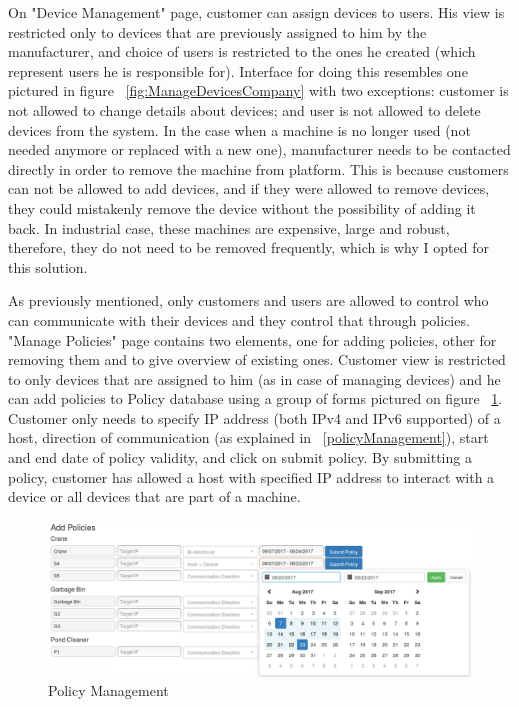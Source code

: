 On "Device Management" page, customer can assign devices to users. His view is restricted only to devices that are previously assigned to him by the manufacturer, and choice of users is restricted to the ones he created (which represent users he is responsible for). Interface for doing this resembles one pictured in figure ~\ref{fig:ManageDevicesCompany} with two exceptions: customer is not allowed to change details about devices; and user is not allowed to 
delete devices from the system. In the case when a machine is no longer used (not needed anymore or replaced with a new one), manufacturer needs to be contacted directly in order to remove the machine from platform. This is because customers can not be allowed to add devices, and if they were allowed to remove devices, they could mistakenly remove the device without the possibility of adding it back. In industrial case, these machines are expensive, large and robust, therefore, they do not need to be removed frequently, which is why I opted for this solution.

As previously mentioned, only customers and users are allowed to control who can communicate with their devices and they control that through policies. "Manage Policies" page contains two elements, one for adding policies, other for removing them and to give overview of existing ones. Customer view is restricted to only devices that are assigned to him (as in case of managing devices) and he can add policies to Policy database using a group of forms pictured on figure ~\ref{fig:ManagePolicies}. Customer only needs to specify IP address (both IPv4 and IPv6 supported) of a host, direction of communication (as explained in ~\ref{policyManagement}), start and end date of policy validity, and click on submit policy. By submitting a policy, customer has allowed a host with specified IP address to interact with a device or all devices that are part of a machine.

\begin{figure}[ht]
	\begin{center}
		\includegraphics[width=\textwidth]{images/implementation/ManagePolicies}
		\caption{Policy Management}
		\label{fig:ManagePolicies}
	\end{center}
\end{figure}

